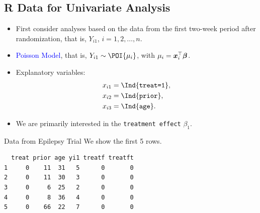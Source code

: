 \documentclass{article}\usepackage[]{graphicx}\usepackage[svgnames]{xcolor}
\makeatletter
\newenvironment{kframe}{%
 \def\at@end@of@kframe{}%
 \ifinner\ifhmode%
  \def\at@end@of@kframe{\end{minipage}}%
  \begin{minipage}{\columnwidth}%
 \fi\fi%
 \def\FrameCommand##1{\hskip\@totalleftmargin \hskip-\fboxsep
 \colorbox{shadecolor}{##1}\hskip-\fboxsep
     \hskip-\linewidth \hskip-\@totalleftmargin \hskip\columnwidth}%
 \MakeFramed {\advance\hsize-\width
   \@totalleftmargin\z@ \linewidth\hsize
   \@setminipage}}%
 {\par\unskip\endMakeFramed%
 \at@end@of@kframe}
\newenvironment{knitrout}{}{} %
\let\log\relax%
\providecommand{\Vector}[1]{\bm{#1}}%
\makeatother
\begin{document}
\subsection*{R Data for Univariate Analysis}
\begin{itemize}
      \item First consider analyses based on the data from the first two-week period after
            randomization, that is, $ Y_{i1} $, $ i=1,2,\ldots,n $.
      \item \textcolor{Blue}{Poisson Model}, that is, $ Y_{i1}\sim \POI{\mu_i} $, with $ \log{\mu_i}=\Vector{x}_i^\top \Vector{\beta} $.
      \item Explanatory variables:
            \begin{align*}
                  x_{i1} & =\Ind{\texttt{treat=1}}, \\
                  x_{i2} & =\Ind{\texttt{prior}},   \\
                  x_{i3} & =\Ind{\texttt{age}}.
            \end{align*}
      \item We are primarily interested in the \texttt{treatment effect} $ \beta_1 $.
\end{itemize}
\begin{Example}{Data from Epilepsy Trial}
      We show the first 5 rows.
\begin{knitrout}
\color{fgcolor}\begin{kframe}
\begin{verbatim}
  treat prior age yi1 treatf treatft
1     0    11  31   5      0       0
2     0    11  30   3      0       0
3     0     6  25   2      0       0
4     0     8  36   4      0       0
5     0    66  22   7      0       0
\end{verbatim}
\end{kframe}
\end{knitrout}
\end{Example}
\end{document}
